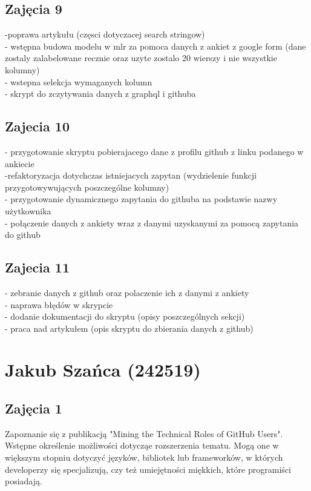 \documentclass[graybox]{svmult}
\begin{document}
\subsection{Zajęcia 9}
-poprawa artykułu (częsci dotyczacej search stringow)
\\- wstępna budowa modelu w mlr za pomoca danych z ankiet z google form (dane zostaly zalabelowane recznie oraz uzyte zostalo 20 wierszy i nie wszystkie kolumny)
\\- wstepna selekcja wymaganych kolumn
\\- skrypt do zczytywania danych z graphql i githuba

\subsection{Zajecia 10}
- przygotowanie skryptu pobierajacego dane z profilu github z linku podanego w ankiecie
\\ -refaktoryzacja dotychczas istniejacych zapytan (wydzielenie funkcji przygotowywujących poszczególne kolumny)
\\ - przygotowanie dynamicznego zapytania do githuba na podstawie nazwy użytkownika
\\ - połączenie danych z ankiety wraz z danymi uzyskanymi za pomocą zapytania do github

\subsection{Zajecia 11}
- zebranie danych z github oraz polaczenie ich z danymi z ankiety
\\- naprawa błędów w skrypcie
\\- dodanie dokumentacji do skryptu (opisy poszczególnych sekcji)
\\- praca nad artykułem (opis skryptu do zbierania danych z github)


\newpage

\section{Jakub Szańca (242519)}
\subsection{Zajęcia 1}

Zapoznanie się z publikacją "Mining the Technical Roles of GitHub Users". Wstępne określenie możliwości dotycząe rozszerzenia tematu. Mogą one w większym stopniu dotyczyć języków, bibliotek lub frameworków, w których developerzy się specjalizują, czy też umiejętności miękkich, które programiści posiadają.
\end{document}
